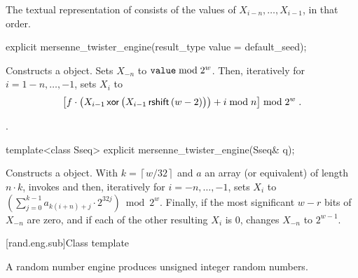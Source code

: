 \pnum
The textual representation%
of 
consists of
the values of
 $X_{i-n}, \ldots, X_{i-1}$,
in that order.

%

\begin{itemdecl}
explicit mersenne_twister_engine(result_type value = default_seed);
\end{itemdecl}

\begin{itemdescr}
\pnum\effects Constructs a  object.
Sets $X_{-n}$ to $\texttt{value} \bmod 2^w$.
 Then, iteratively for $i = 1\!-\!n,\ldots,-1$,
 sets $X_i$
 to
\[%
 \bigl[f \cdot
       \bigl(X_{i-1} \xor \bigl(X_{i-1} \rightshift (w-2)\bigr)
       \bigr)
       + i \bmod n
 \bigr] \bmod 2^w
\; \mbox{.}
\]%

\pnum\complexity {}.
\end{itemdescr}

%

\begin{itemdecl}
template<class Sseq> explicit mersenne_twister_engine(Sseq& q);
\end{itemdecl}

\begin{itemdescr}
\pnum\effects Constructs a  object.
 With
 $ k = \left\lceil w / 32 \right\rceil $
 and $a$ an array (or equivalent)
 of length $ n \cdot k $,
 invokes 
 and then, iteratively for $i = -n,\ldots,-1$,
 sets $X_i$
 to $ \left(\sum_{j=0}^{k-1}a_{k(i+n)+j} \cdot 2^{32j} \right) \bmod 2^w $.
 Finally,
 if the most significant $w-r$ bits of $X_{-n}$
 are zero,
 and if each of the other resulting $X_i$ is $0$,
 changes $X_{-n}$
 to $ 2^{w-1} $.
\end{itemdescr}


[rand.eng.sub]{Class template }%
%

\pnum
A  random number engine
produces unsigned integer random numbers.

